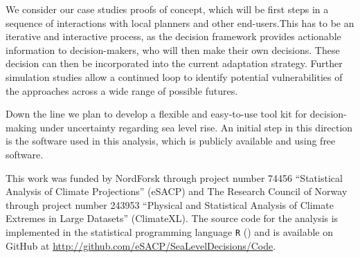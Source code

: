 \documentclass[draft,linenumbers]{agujournal}
\begin{document}
We consider our case studies proofs of concept, which will be first steps in a sequence of interactions with local planners and other end-users.This has to be an iterative and interactive process, as the decision framework provides actionable information to decision-makers, who will then make their own decisions. These decision can then be incorporated into the current adaptation strategy. Further simulation studies allow a continued loop to identify potential vulnerabilities of the approaches across a wide range of possible futures.

Down the line we plan to develop a flexible and easy-to-use tool kit for decision-making under uncertainty regarding sea level rise. An initial step in this direction is the software used in this analysis, which is publicly available and using free software. 




\begin{acknowledgments}
This work was funded by NordForsk through project number 74456 ``Statistical Analysis of Climate Projections'' (eSACP) and The Research Council of Norway through project number 243953 ``Physical and Statistical Analysis of Climate Extremes in Large Datasets'' (ClimateXL). The source code for the analysis is implemented in the statistical programming language {\tt R} (\citet{R}) and is available on GitHub at \url{http://github.com/eSACP/SeaLevelDecisions/Code}.
\end{acknowledgments}








\end{document}

